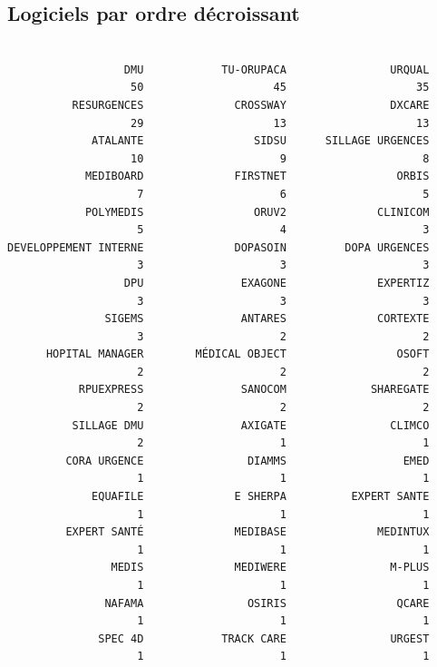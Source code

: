 \documentclass[]{article}
\begin{document}
\subsection{Logiciels par ordre
décroissant}\label{logiciels-par-ordre-decroissant}

\begin{verbatim}

                  DMU            TU-ORUPACA                URQUAL 
                   50                    45                    35 
          RESURGENCES              CROSSWAY                DXCARE 
                   29                    13                    13 
             ATALANTE                 SIDSU      SILLAGE URGENCES 
                   10                     9                     8 
            MEDIBOARD              FIRSTNET                 ORBIS 
                    7                     6                     5 
            POLYMEDIS                 ORUV2              CLINICOM 
                    5                     4                     3 
DEVELOPPEMENT INTERNE              DOPASOIN         DOPA URGENCES 
                    3                     3                     3 
                  DPU               EXAGONE              EXPERTIZ 
                    3                     3                     3 
               SIGEMS               ANTARES              CORTEXTE 
                    3                     2                     2 
      HOPITAL MANAGER        MÉDICAL OBJECT                 OSOFT 
                    2                     2                     2 
           RPUEXPRESS               SANOCOM             SHAREGATE 
                    2                     2                     2 
          SILLAGE DMU               AXIGATE                CLIMCO 
                    2                     1                     1 
         CORA URGENCE                DIAMMS                  EMED 
                    1                     1                     1 
             EQUAFILE              E SHERPA          EXPERT SANTE 
                    1                     1                     1 
         EXPERT SANTÉ              MEDIBASE              MEDINTUX 
                    1                     1                     1 
                MEDIS              MEDIWERE                M-PLUS 
                    1                     1                     1 
               NAFAMA                OSIRIS                 QCARE 
                    1                     1                     1 
              SPEC 4D            TRACK CARE                URGEST 
                    1                     1                     1 
\end{verbatim}
\end{document}
